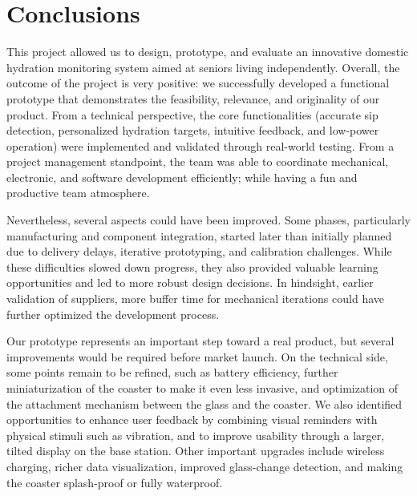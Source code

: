 \documentclass{article}
\begin{document}


\section{Conclusions}
\label{FinalProduct}
\label{sec:perspective}

This project allowed us to design, prototype, and evaluate an innovative domestic hydration monitoring system aimed at seniors living independently. Overall, the outcome of the project is very positive: we successfully developed a functional prototype that demonstrates the feasibility, relevance, and originality of our product. From a technical perspective, the core functionalities (accurate sip detection, personalized hydration targets, intuitive feedback, and low-power operation) were implemented and validated through real-world testing. From a project management standpoint, the team was able to coordinate mechanical, electronic, and software development efficiently; while having a fun and productive team atmosphere.\vspace{0.1cm}

Nevertheless, several aspects could have been improved. Some phases, particularly manufacturing and component integration, started later than initially planned due to delivery delays, iterative prototyping, and calibration challenges. While these difficulties slowed down progress, they also provided valuable learning opportunities and led to more robust design decisions. In hindsight, earlier validation of suppliers, more buffer time for mechanical iterations could have further optimized the development process.\vspace{0.1cm}

Our prototype represents an important step toward a real product, but several improvements would be required before market launch. On the technical side, some points remain to be refined, such as battery efficiency, further miniaturization of the coaster to make it even less invasive, and optimization of the attachment mechanism between the glass and the coaster. We also identified opportunities to enhance user feedback by combining visual reminders with physical stimuli such as vibration, and to improve usability through a larger, tilted display on the base station. Other important upgrades include wireless charging, richer data visualization, improved glass-change detection, and making the coaster splash-proof or fully waterproof.\vspace{0.1cm}
\end{document}
